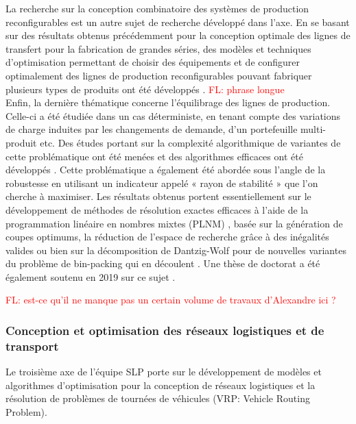 La recherche sur la conception combinatoire des systèmes de production reconfigurables est un autre sujet de recherche développé dans l’axe. En se basant sur des résultats obtenus précédemment pour la conception optimale des lignes de transfert pour la fabrication de grandes séries, des modèles et techniques d'optimisation permettant de choisir des équipements et de configurer optimalement des lignes de production reconfigurables pouvant fabriquer plusieurs types de produits ont été développés \cite{battaia:hal-01435089,battaia:hal-01523726,Dolgui2019,Dolgui2020,Battaia2020,yelleschaouche:hal-02485673}. 
\textcolor{red}{FL: phrase longue}\\

Enfin, la dernière thématique concerne l’équilibrage des lignes de production. Celle-ci a été étudiée dans un cas déterministe, en tenant compte des variations de charge induites par les changements de demande, d’un portefeuille multi-produit etc. Des études portant sur la complexité algorithmique de variantes de cette problématique ont été menées et des algorithmes efficaces ont été développés \cite{dolgui:hal-01688688,delorme:emse-01840007}. Cette problématique a également été abordée sous l’angle de la robustesse en utilisant un indicateur appelé « rayon de stabilité » que l’on cherche à maximiser. Les résultats obtenus portent essentiellement sur le développement de méthodes de résolution exactes efficaces à l’aide de la programmation linéaire en nombres mixtes (PLNM) \cite{rossi:hal-01301625}, basée sur la génération de coupes optimums, la réduction de l’espace de recherche grâce à des inégalités valides \cite{pirogov:hal-01614455,pirogov:hal-01832920,pirogov:hal-01713722} ou bien sur la décomposition de Dantzig-Wolf pour de nouvelles variantes du problème de bin-packing qui en découlent \cite{schepler:hal-01518356,schepler:hal-01474542,schepler:hal-02485676}. Une thèse de doctorat a été également soutenu en 2019 sur ce sujet \cite{pirogov:tel-02418792}.
  
\textcolor{red}{FL: est-ce qu'il ne manque pas un certain volume de travaux d'Alexandre ici ?}

  \subsubsection{Conception et optimisation des réseaux logistiques et de transport}
  		
   
Le troisième axe de l'équipe SLP porte sur le développement de modèles et algorithmes d'optimisation pour la conception de réseaux logistiques et la résolution de problèmes de tournées de véhicules (VRP: Vehicle Routing Problem).

